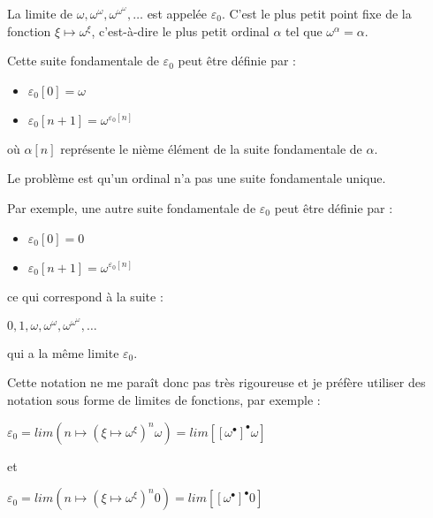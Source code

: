 \documentclass[12pt]{beamer}
\begin{document}
\begin{frame}

\footnotesize

La limite de \( \omega, \omega^\omega, \omega^{\omega^\omega}, \ldots \) est appelée \( \varepsilon_0 \).
C'est le plus petit point fixe de la fonction \( \xi \mapsto \omega^\xi \), c'est-à-dire le plus petit ordinal \( \alpha \) tel que \( \omega^\alpha = \alpha \).

Cette suite fondamentale de \(\varepsilon_0 \) peut être définie par : 

\begin{itemize}
     \setlength{\itemsep}{1pt}
     \setlength{\parskip}{0pt}
     \setlength{\parsep}{0pt}
\item \( \varepsilon_0[0] = \omega \)
\item \( \varepsilon_0[n+1] = \omega^{\varepsilon_0[n]} \)
\end{itemize}

où \( \alpha[n] \) représente le nième élément de la suite fondamentale de \( \alpha \).

Le problème est qu'un ordinal n'a pas une suite fondamentale unique.

Par exemple, une autre suite fondamentale de \( \varepsilon_0 \) peut être définie par :

\begin{itemize}
     \setlength{\itemsep}{1pt}
     \setlength{\parskip}{0pt}
     \setlength{\parsep}{0pt}
\item \( \varepsilon_0[0] = 0 \)
\item \( \varepsilon_0[n+1] = \omega^{\varepsilon_0[n]} \)
\end{itemize}

ce qui correspond à la suite :

\( 0, 1, \omega, \omega^\omega, \omega^{\omega^\omega}, \ldots \)

qui a la même limite \( \varepsilon_0 \).

Cette notation ne me paraît donc pas très rigoureuse et je préfère utiliser des notation sous forme de limites de fonctions, par exemple :

\( \varepsilon_0 = lim (n \mapsto (\xi \mapsto \omega^\xi)^n \omega) = lim [[\omega^\bullet]^\bullet \omega] \)

et

\( \varepsilon_0 = lim (n \mapsto (\xi \mapsto \omega^\xi)^n 0) = lim [[\omega^\bullet]^\bullet 0] \)

\end{frame}
\end{document}
